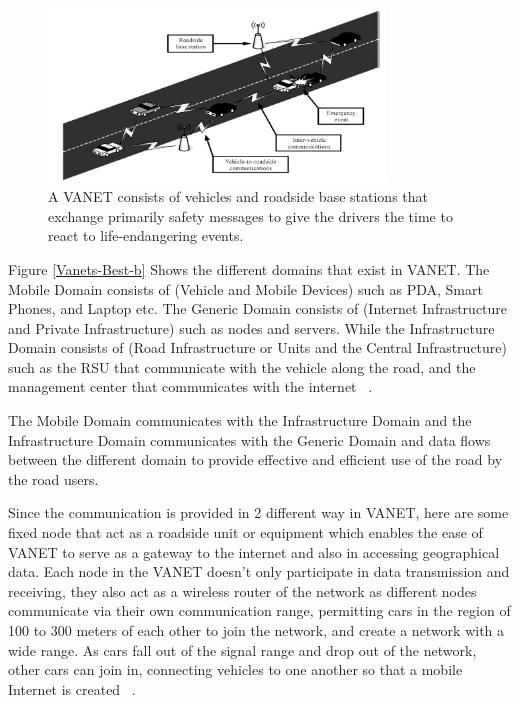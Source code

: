 \documentclass[
  oneside,
  11pt, a4paper,
  footinclude=true,
  headinclude=true,
  cleardoublepage=empty
]{scrbook}
\begin{document}
\begin{figure}[H]
\begin{center}
  \includegraphics[width=0.8\textwidth]{img/v1.png}
\end{center}
  \caption{A VANET consists of vehicles and roadside base stations that exchange primarily safety messages to give the
drivers the time to react to life-endangering events. ~\cite{vanetusarlater}}
  \centering  
\label{Vanets-Best}
\end{figure}


Figure \ref{Vanets-Best-b} Shows the different domains that exist in VANET. The Mobile Domain consists of (Vehicle and Mobile Devices) such as PDA, Smart Phones, and Laptop etc. The Generic Domain consists of (Internet Infrastructure and Private Infrastructure) such as nodes and servers. While the Infrastructure Domain consists of (Road Infrastructure or Units and the Central Infrastructure) such as the RSU that communicate with the vehicle along the road, and the management center that communicates with the internet ~\cite{vanetusarlater}.\par
The Mobile Domain communicates with the Infrastructure Domain and the Infrastructure Domain communicates with the Generic Domain and data flows between the different domain to provide effective and efficient use of the road by the road users.\par
Since the communication is provided in 2 different way in VANET,  here are some fixed node that act as a roadside unit or equipment which enables the ease of VANET to serve as a gateway to the internet and also in accessing geographical data. Each node in the VANET doesn’t only participate in data transmission and receiving, they also act as a wireless router of the network as different nodes communicate via their own communication range, permitting cars in the region of 100 to 300 meters of each other to join the network, and create a network with a wide range. As cars fall out of the signal range and drop out of the network, other cars can join in, connecting vehicles to one another so that a mobile Internet is created ~\cite{vanetusarlater}.
\end{document}
